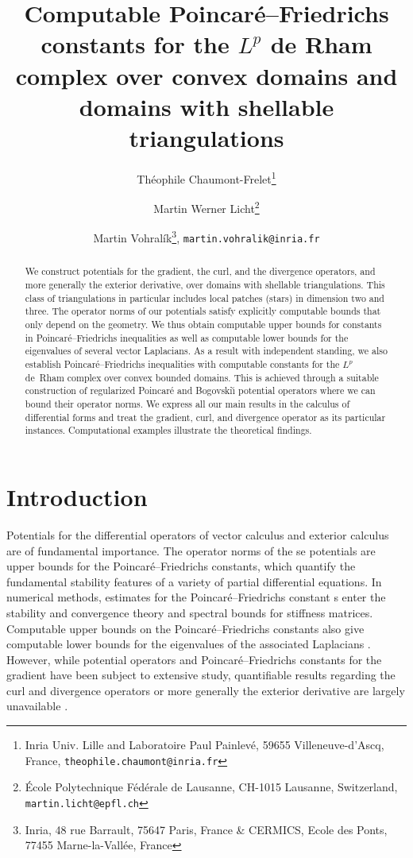 \documentclass[10pt,a4paper]{article}
\title{Computable Poincar\'e--Friedrichs constants for the $L^{p}$ de Rham complex over convex domains and domains with shellable triangulations}
\author{
    Th\'eophile Chaumont-Frelet\thanks{Inria Univ. Lille and Laboratoire Paul Painlev\'e, 59655 Villeneuve-d'Ascq, France, \texttt{theophile.chaumont@inria.fr}} \and
    Martin Werner Licht\thanks{\'Ecole Polytechnique F\'ed\'erale de Lausanne, CH-1015 Lausanne, Switzerland, \texttt{martin.licht@epfl.ch}} \and
    Martin Vohral\'ik\thanks{Inria, 48 rue Barrault, 75647 Paris, France \& CERMICS, Ecole des Ponts, 77455 Marne-la-Vall\'ee, France}, \texttt{martin.vohralik@inria.fr}
}
\newcommand\cye[1]{%
\protect\leavevmode
\begingroup
    \color{blue}%
    #1%
\endgroup
}
\newcommand{\mwl}[1]{{\color{red}#1}}
\begin{document}
\maketitle

\begin{abstract}
    We construct potentials for the gradient, the curl, and the divergence operators, and more generally the exterior derivative, over domains with shellable triangulations. 
    This class of triangulations in particular includes local patches (stars) in dimension two and three.
    The operator norms of our potentials satisfy explicitly computable bounds that only depend on the geometry. 
    We thus obtain computable upper bounds for constants in Poincar\'e--Friedrichs inequalities as well as computable lower bounds for the eigenvalues of several vector Laplacians. 
    As a result with independent standing, we also establish Poincar\'e--Friedrichs inequalities with computable constants for the $L^{p}$ de~Rham complex over convex bounded domains. 
    This is achieved through a suitable construction of regularized Poincar\'e and Bogovski\u{\i} potential operators where we can bound their operator norms.
    \mwl{We express all our main results in the calculus of differential forms and treat the gradient, curl, and divergence operator as its particular instances.} 
    Computational examples illustrate the theoretical findings.
\end{abstract}


\tableofcontents
 



\section{Introduction}\label{section:intro}

Potentials for the differential operators of vector calculus and exterior calculus are of fundamental importance. The operator norms of the\cye{se} potentials are upper bounds for the Poincar\'e--Friedrichs constants, which quantify the fundamental stability features of a variety of partial differential equations. In numerical methods, estimates for the Poincar\'e--Friedrichs constant\cye{s} enter the stability and convergence theory and spectral bounds for \cye{stiffness} matrices. \cye{Computable upper bounds on the Poincar\'e--Friedrichs constants also give computable lower bounds for the eigenvalues of the associated Laplacians}. However, while potential operators and Poincar\'e--Friedrichs constants for the gradient have been subject to extensive study, quantifiable results regarding the curl and divergence operators or \cye{more generally} the exterior derivative are \cye{largely unavailable}. 
\end{document}
